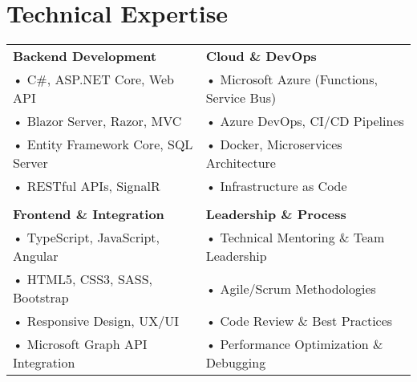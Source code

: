 \documentclass[paper=a4,fontsize=11pt]{article}
\newcommand{\sepspace}{\vspace*{0.8em}}
\newcommand{\NewPart}[1]{\section{#1}}
\begin{document}
\sepspace

\NewPart{Technical Expertise}
\noindent
\begin{tabularx}{\textwidth}{@{}X X@{}}
\textbf{\color{primary}Backend Development} & \textbf{\color{primary}Cloud \& DevOps} \\
• C\#, ASP.NET Core, Web API & • Microsoft Azure (Functions, Service Bus) \\
• Blazor Server, Razor, MVC & • Azure DevOps, CI/CD Pipelines \\
• Entity Framework Core, SQL Server & • Docker, Microservices Architecture \\
• RESTful APIs, SignalR & • Infrastructure as Code \\
\\[-0.5em]
\textbf{\color{primary}Frontend \& Integration} & \textbf{\color{primary}Leadership \& Process} \\
• TypeScript, JavaScript, Angular & • Technical Mentoring \& Team Leadership \\
• HTML5, CSS3, SASS, Bootstrap & • Agile/Scrum Methodologies \\
• Responsive Design, UX/UI & • Code Review \& Best Practices \\
• Microsoft Graph API Integration & • Performance Optimization \& Debugging \\
\end{tabularx}

\sepspace

	
\end{document}
